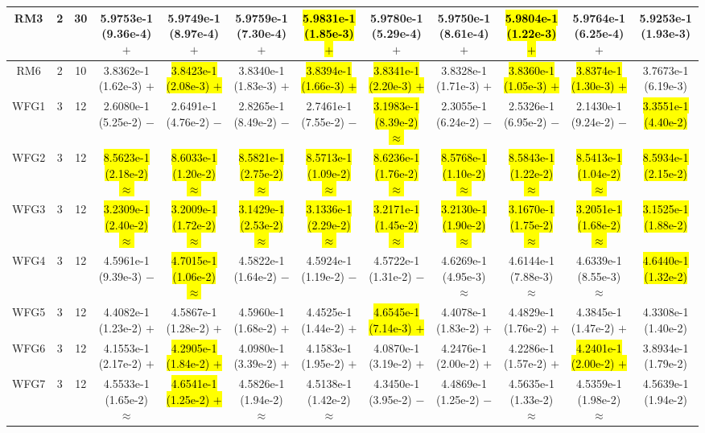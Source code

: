 \documentclass[journal]{IEEEtran}
\begin{document}
\begin{table*}[htbp]
\begin{tabular}{cccccccccccc}
\hline
\multirow{1}{*}{RM3}&2&30&5.9753e-1 (9.36e-4) $+$&5.9749e-1 (8.97e-4) $+$&5.9759e-1 (7.30e-4) $+$&\hl{5.9831e-1 (1.85e-3) $+$}&5.9780e-1 (5.29e-4) $+$&5.9750e-1 (8.61e-4) $+$&\hl{5.9804e-1 (1.22e-3) $+$}&5.9764e-1 (6.25e-4) $+$&5.9253e-1 (1.93e-3)\\
\hline
\multirow{1}{*}{RM6}&2&10&3.8362e-1 (1.62e-3) $+$&\hl{3.8423e-1 (2.08e-3) $+$}&3.8340e-1 (1.83e-3) $+$&\hl{3.8394e-1 (1.66e-3) $+$}&\hl{3.8341e-1 (2.20e-3) $+$}&3.8328e-1 (1.71e-3) $+$&\hl{3.8360e-1 (1.05e-3) $+$}&\hl{3.8374e-1 (1.30e-3) $+$}&3.7673e-1 (6.19e-3)\\
\hline
\multirow{1}{*}{WFG1}&3&12&2.6080e-1 (5.25e-2) $-$&2.6491e-1 (4.76e-2) $-$&2.8265e-1 (8.49e-2) $-$&2.7461e-1 (7.55e-2) $-$&\hl{3.1983e-1 (8.39e-2) $\approx$}&2.3055e-1 (6.24e-2) $-$&2.5326e-1 (6.95e-2) $-$&2.1430e-1 (9.24e-2) $-$&\hl{3.3551e-1 (4.40e-2)}\\
\hline
\multirow{1}{*}{WFG2}&3&12&\hl{8.5623e-1 (2.18e-2) $\approx$}&\hl{8.6033e-1 (1.20e-2) $\approx$}&\hl{8.5821e-1 (2.75e-2) $\approx$}&\hl{8.5713e-1 (1.09e-2) $\approx$}&\hl{8.6236e-1 (1.76e-2) $\approx$}&\hl{8.5768e-1 (1.10e-2) $\approx$}&\hl{8.5843e-1 (1.22e-2) $\approx$}&\hl{8.5413e-1 (1.04e-2) $\approx$}&\hl{8.5934e-1 (2.15e-2)}\\
\hline
\multirow{1}{*}{WFG3}&3&12&\hl{3.2309e-1 (2.40e-2) $\approx$}&\hl{3.2009e-1 (1.72e-2) $\approx$}&\hl{3.1429e-1 (2.53e-2) $\approx$}&\hl{3.1336e-1 (2.29e-2) $\approx$}&\hl{3.2171e-1 (1.45e-2) $\approx$}&\hl{3.2130e-1 (1.90e-2) $\approx$}&\hl{3.1670e-1 (1.75e-2) $\approx$}&\hl{3.2051e-1 (1.68e-2) $\approx$}&\hl{3.1525e-1 (1.88e-2)}\\
\hline
\multirow{1}{*}{WFG4}&3&12&4.5961e-1 (9.39e-3) $-$&\hl{4.7015e-1 (1.06e-2) $\approx$}&4.5822e-1 (1.64e-2) $-$&4.5924e-1 (1.19e-2) $-$&4.5722e-1 (1.31e-2) $-$&4.6269e-1 (4.95e-3) $\approx$&4.6144e-1 (7.88e-3) $\approx$&4.6339e-1 (8.55e-3) $\approx$&\hl{4.6440e-1 (1.32e-2)}\\
\hline
\multirow{1}{*}{WFG5}&3&12&4.4082e-1 (1.23e-2) $+$&4.5867e-1 (1.28e-2) $+$&4.5960e-1 (1.68e-2) $+$&4.4525e-1 (1.44e-2) $+$&\hl{4.6545e-1 (7.14e-3) $+$}&4.4078e-1 (1.83e-2) $+$&4.4829e-1 (1.76e-2) $+$&4.3845e-1 (1.47e-2) $+$&4.3308e-1 (1.40e-2)\\
\hline
\multirow{1}{*}{WFG6}&3&12&4.1553e-1 (2.17e-2) $+$&\hl{4.2905e-1 (1.84e-2) $+$}&4.0980e-1 (3.39e-2) $+$&4.1583e-1 (1.95e-2) $+$&4.0870e-1 (3.19e-2) $+$&4.2476e-1 (2.00e-2) $+$&4.2286e-1 (1.57e-2) $+$&\hl{4.2401e-1 (2.00e-2) $+$}&3.8934e-1 (1.79e-2)\\
\hline
\multirow{1}{*}{WFG7}&3&12&4.5533e-1 (1.65e-2) $\approx$&\hl{4.6541e-1 (1.25e-2) $+$}&4.5826e-1 (1.94e-2) $\approx$&4.5138e-1 (1.42e-2) $\approx$&4.3450e-1 (3.95e-2) $-$&4.4869e-1 (1.25e-2) $-$&4.5635e-1 (1.33e-2) $\approx$&4.5359e-1 (1.98e-2) $\approx$&4.5639e-1 (1.94e-2)\\

\end{tabular}
\end{table*}
\end{document}
